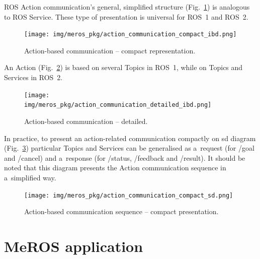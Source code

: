 \documentclass[11pt,oneside,a4paper]{report}
\begin{document}
	ROS Action communication's general, simplified structure (Fig.~\ref{fig:action_communication_compact_ibd}) is analogous to ROS Service. These type of presentation is universal for ROS~1 and ROS~2.
	

	\begin{figure}[H]
		\centering
		\begin{center}
			{\texttt{[image: img/meros\_pkg/action\_communication\_compact\_ibd.png]}}
		\end{center}
		\caption{Action-based communication -- compact representation.} 
		\label{fig:action_communication_compact_ibd}
	\end{figure}
	
	
	 An Action (Fig.~\ref{fig:action_communication_detailed_ibd}) is based on several Topics in ROS~1, while on Topics and Services in ROS~2.
	

	\begin{figure}[H]
		\centering
		\begin{center}
			{\texttt{[image: img/meros\_pkg/action\_communication\_detailed\_ibd.png]}}
		\end{center}
		\caption{Action-based communication -- detailed.} 
		\label{fig:action_communication_detailed_ibd}
	\end{figure}
	
	In practice, to present an action-related communication compactly on sd diagram (Fig.~\ref{fig:action_communication_compact_sd}) particular Topics and Services can be generalised as a~request (for /goal and /cancel) and a~response (for /status, /feedback and /result). It should be noted that this diagram presents the Action communication sequence in a~simplified way.
	
	\begin{figure}[H]
		\centering
		\begin{center}
			{\texttt{[image: img/meros\_pkg/action\_communication\_compact\_sd.png]}}
		\end{center}
		\caption{Action-based communication sequence -- compact presentation.} 
		\label{fig:action_communication_compact_sd}
	\end{figure}

	
	
\chapter{MeROS application}
\label{ch:application}
	
\end{document}
